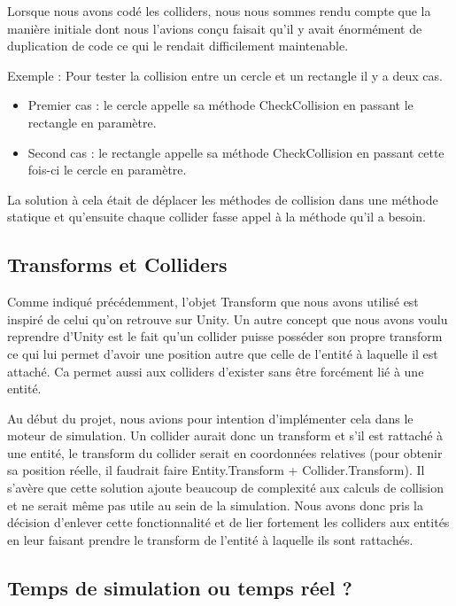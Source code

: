 \documentclass{EPUProjetDi}
\begin{document}
Lorsque nous avons codé les colliders, nous nous sommes rendu compte que la manière initiale dont nous l'avions conçu
faisait qu'il y avait énormément de duplication de code ce qui le rendait difficilement maintenable.

Exemple : Pour tester la collision entre un cercle et un rectangle il y a deux cas. 
\begin{itemize}
    \item Premier cas : le cercle appelle sa méthode CheckCollision en passant le rectangle en paramètre.
    \item Second cas : le rectangle appelle sa méthode CheckCollision en passant cette fois-ci le cercle en paramètre.
\end{itemize}

La solution à cela était de déplacer les méthodes de collision dans une méthode statique et qu'ensuite chaque collider fasse appel à la méthode
qu'il a besoin.

\subsection{Transforms et Colliders}

Comme indiqué précédemment, l'objet Transform que nous avons utilisé est inspiré de celui qu'on retrouve sur Unity. Un autre concept que nous avons voulu reprendre d'Unity est le fait qu'un
collider puisse posséder son propre transform ce qui lui permet d'avoir une position autre que celle de l'entité à laquelle il est attaché. Ca permet aussi aux colliders d'exister sans être forcément
lié à une entité.

Au début du projet, nous avions pour intention d'implémenter cela dans le moteur de simulation. 
Un collider aurait donc un transform et s'il est rattaché à une entité, le transform du collider serait en coordonnées relatives (pour obtenir sa position réelle, il faudrait faire Entity.Transform + Collider.Transform).
Il s'avère que cette solution ajoute beaucoup de complexité aux calculs de collision et ne serait même pas utile au sein de la simulation. Nous avons donc pris la décision d'enlever cette 
fonctionnalité et de lier fortement les colliders aux entités en leur faisant prendre le transform de l'entité à laquelle ils sont rattachés.

\subsection{Temps de simulation ou temps réel ?}
\end{document}
